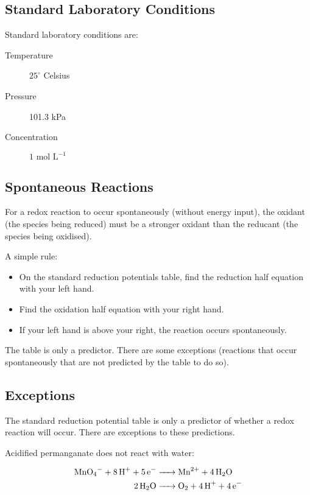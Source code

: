 \documentclass[a4paper,11pt]{article}
\begin{document}
\subsection{Standard Laboratory Conditions}

Standard laboratory conditions are:

\begin{description}
\item [Temperature] $25^\circ$ Celsius
\item [Pressure] 101.3 kPa
\item [Concentration] $1\text{ mol L}^{-1}$
\end{description}

\subsection{Spontaneous Reactions}

For a redox reaction to occur spontaneously (without energy input), the oxidant
(the species being reduced) must be a stronger oxidant than the reducant (the
species being oxidised).

A simple rule:

\begin{itemize}
\item On the standard reduction potentials table, find the reduction half
	equation with your left hand.
\item Find the oxidation half equation with your right hand.
\item If your left hand is above your right, the reaction occurs spontaneously.
\end{itemize}

The table is only a predictor. There are some exceptions (reactions that occur
spontaneously that are not predicted by the table to do so).

\subsection{Exceptions}

The standard reduction potential table is only a predictor of whether a redox
reaction will occur. There are exceptions to these predictions.

Acidified permanganate does not react with water:

$$
\begin{aligned}
\ce{MnO4- + 8H+ + 5e- & -> Mn^{2+} + 4H2O} \\
\ce{2H2O & -> O2 + 4H+ + 4e-} \\
\end{aligned}
$$
\end{document}
